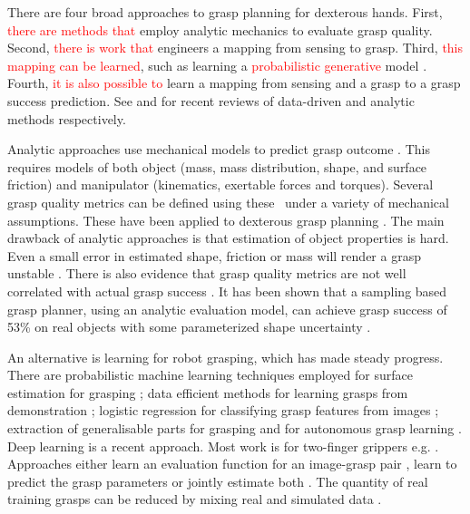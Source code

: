 There are four broad approaches to grasp planning for dexterous hands. First, \textcolor{red}{there are methods that} employ analytic mechanics to evaluate grasp quality. Second, \textcolor{red}{there is work that} engineers a mapping from sensing to grasp. Third, \textcolor{red}{this mapping can be learned}, such as learning a \textcolor{red}{probabilistic generative} model \cite{bishop_pattern_2006}. Fourth, \textcolor{red}{it is also possible to} learn a mapping from sensing and a grasp to a grasp success prediction. See \cite{bohg2014data} and  \cite{sahbani2012overview} for recent reviews of data-driven and analytic methods respectively.

Analytic approaches use mechanical models to predict grasp outcome \cite{bicchi2000a,Liu2000,Pollard2004,miller2004}. This requires models of both object (mass, mass distribution, shape, and surface friction) and manipulator (kinematics, exertable forces and torques). Several grasp quality metrics can be defined using these~\cite{Ferrari1992,Roa2015,Shimoga1996} under a variety of mechanical assumptions. These have been applied to dexterous grasp planning \cite{Boutselis2014,Gori2014,Hang2014,Rosales2012,Saut2012,ciocarlie2009hand}. The main drawback of analytic approaches is that estimation of object properties is hard. Even a small error in estimated shape, friction or mass will render a grasp unstable \cite{zheng2005a}. There is also evidence that grasp quality metrics are not well correlated with actual grasp success \cite{bekiroglu2011b,kim2013a,goins2014a}. It has been shown that a sampling based grasp planner, using an analytic evaluation model, can achieve grasp success of 53\% on real objects with some parameterized shape uncertainty \cite{li2016dexterous}.

An alternative is learning for robot grasping, which has made steady progress. There are probabilistic machine learning techniques employed for surface estimation for grasping \cite{dragiev2011gaussian}; data efficient methods for learning grasps from demonstration \cite{ben-amor2012a,kopicki2015ijrr,Osa2018}; logistic regression for classifying grasp features from images \cite{saxena2008a}; extraction of generalisable parts for grasping \cite{detry2012a} and for autonomous grasp learning \cite{detry2010a}. Deep learning is a recent approach. Most work is for two-finger grippers e.g. \cite{songiros20}. Approaches either learn an evaluation function for an image-grasp pair \cite{levine16,lenz2015deep,gualtieri2016high,mahler2017dex,pinto2016supersizing,johns2016deep}, learn to predict the grasp parameters \cite{redmon2015real,kumra2017iros} or jointly estimate both \cite{morrison18}. The quantity of real training grasps can be reduced by mixing real and simulated data \cite{bousmalis2017using}. 


